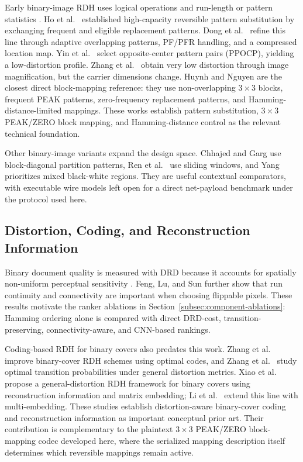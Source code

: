 \documentclass[a4paper,fleqn]{cas-dc}
\begin{document}
Early binary-image RDH uses logical operations and run-length or pattern
statistics \cite{Xuan2008RunLength}. Ho et al.\ \cite{Ho2009PatternSubstitution} established
high-capacity reversible pattern substitution by exchanging frequent and
eligible replacement patterns. Dong et al.\ \cite{Dong2020Adaptive} refine this
line through adaptive overlapping patterns, PF/PFR handling, and a compressed
location map. Yin et al.\ \cite{Yin2020PPOCP} select opposite-center pattern
pairs (PPOCP), yielding a low-distortion profile. Zhang et al.\
\cite{Zhang2019Magnification} obtain very low distortion through image
magnification, but the carrier dimensions change. Huynh and Nguyen
\cite{Huynh2025BlockMapping} are the closest direct block-mapping reference:
they use non-overlapping $3\times3$ blocks, frequent PEAK patterns,
zero-frequency replacement patterns, and Hamming-distance-limited mappings.
These works establish pattern substitution, $3\times3$ PEAK/ZERO block
mapping, and Hamming-distance control as the relevant technical foundation.

Other binary-image variants expand the design space. Chhajed and Garg
\cite{Chhajed2023BlockDiagonal} use block-diagonal partition patterns, Ren
et al.\ \cite{Ren2023Sliding} use sliding windows, and Yang
\cite{Yang2023Large} prioritizes mixed black-white regions. They are useful
contextual comparators, with executable wire models left open for a direct
net-payload benchmark under the protocol used here.

\subsection{Distortion, Coding, and Reconstruction Information}

Binary document quality is measured with DRD because it accounts for spatially
non-uniform perceptual sensitivity \cite{Lu2004DRD}. Feng, Lu, and Sun
\cite{Feng2015Secure} further show that run continuity and connectivity are
important when choosing flippable pixels. These results motivate the ranker
ablations in Section~\ref{subsec:component-ablations}: Hamming ordering alone
is compared with direct DRD-cost, transition-preserving, connectivity-aware,
and CNN-based rankings.

Coding-based RDH for binary covers also predates this work. Zhang et al.\
\cite{Zhang2012OptimalCodes} improve binary-cover RDH schemes using optimal
codes, and Zhang et al.\ \cite{Zhang2015OptimalTransition} study optimal
transition probabilities under general distortion metrics. Xiao et al.\
\cite{Xiao2022BinaryCovers} propose a general-distortion RDH framework for
binary covers using reconstruction information and matrix embedding; Li et
al.\ \cite{Li2023MultiEmbedding} extend this line with multi-embedding.
These studies establish distortion-aware binary-cover coding and
reconstruction information as important conceptual prior art. Their
contribution is complementary to the plaintext $3\times3$ PEAK/ZERO
block-mapping codec developed here, where the serialized mapping description
itself determines which reversible mappings remain active.
\end{document}
